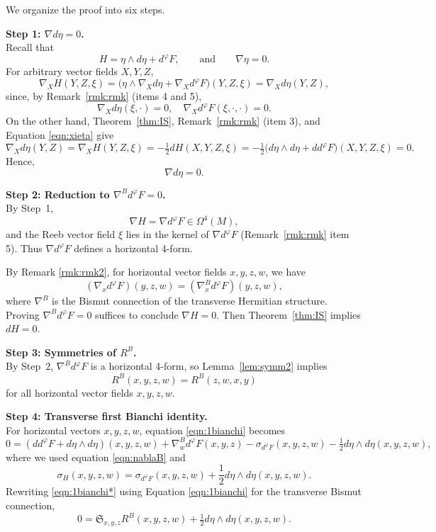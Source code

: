 \documentclass{article}
\makeatletter
\renewenvironment{proof}[1][\proofname]{%
  \par\pushQED{\qed}%
  \normalfont\topsep6\p@\@plus6\p@\relax
  \trivlist
  \item[\hskip\labelsep
        \textbf{\textup{#1}}\@addpunct{.}]\ignorespaces
}{%
  \popQED\endtrivlist\@endpefalse
}
\theoremstyle{definition}
\renewcommand{\phi}{\varphi}
\numberwithin{equation}{section}
\makeatother
\begin{document}
\begin{proof}[Proof of Theorem~\ref{thm:CKL}]
We organize the proof into six steps.

\medskip
\noindent
\textbf{Step 1: \(\nabla d\eta = 0\).}  
\\
Recall that
\[
H = \eta \wedge d\eta + d^\phi F, \qquad \text{and} \qquad \nabla \eta = 0.
\]
For arbitrary vector fields \(X,Y,Z\),
\[
\nabla_X H(Y,Z,\xi) = \big(\eta \wedge \nabla_X d\eta + \nabla_X d^\phi F\big)(Y,Z,\xi) = \nabla_X d\eta(Y,Z),
\]
since, by Remark~\ref{rmk:rmk} (items 4 and 5),
\[
\nabla_X d\eta(\xi,\cdot) = 0, \quad 
\nabla_X d^\phi F(\xi,\cdot,\cdot) = 0.
\]
On the other hand, Theorem~\ref{thm:IS}, Remark~\ref{rmk:rmk} (item 3), and Equation \eqref{eqn:xieta} give
\[
\nabla_X d\eta(Y,Z) = \nabla_X H(Y,Z,\xi) = -\tfrac{1}{2} dH(X,Y,Z,\xi) = -\tfrac{1}{2} \big( d\eta \wedge d\eta + d d^\phi F \big)(X,Y,Z,\xi) = 0.
\]
Hence,
\[
\nabla d\eta = 0.
\]

\medskip
\noindent
\textbf{Step 2: Reduction to \(\nabla^B d^\phi F = 0\).} \\ 
By Step~1,
\[
\nabla H = \nabla d^\phi F \in \Omega^4(M),
\]
and the Reeb vector field \(\xi\) lies in the kernel of \(\nabla d^\phi F\) (Remark~\ref{rmk:rmk} item 5).  
Thus \(\nabla d^\phi F\) defines a horizontal 4-form. \par
By Remark \ref{rmk:rmk2}, for horizontal vector fields \(x,y,z,w\), we have
\begin{equation}\label{eqn:nablaB}
(\nabla_x d^\phi F)(y,z,w) = (\nabla^B_x d^\phi F)(y,z,w),
\end{equation}
where \(\nabla^B\) is the Bismut connection of the transverse Hermitian structure.  
Proving \(\nabla^B d^\phi F = 0\) suffices to conclude \(\nabla H = 0\). Then Theorem~\ref{thm:IS} implies \(dH = 0\).

\medskip
\noindent
\textbf{Step 3: Symmetries of \(R^B\).} \\
By Step~2, \(\nabla^B d^\phi F\) is a horizontal 4-form, so Lemma~\ref{lem:symm2} implies
\[
R^B(x,y,z,w) = R^B(z,w,x,y)
\]
for all horizontal vector fields \(x,y,z,w\).

\medskip
\noindent
\textbf{Step 4: Transverse first Bianchi identity.}  \\
For horizontal vectors \(x,y,z,w\), equation \eqref{eqn:1bianchi} becomes
\begin{equation}\label{eqn:1bianchi*}
0 = (dd^\phi F + d\eta \wedge d\eta)(x,y,z,w) + \nabla^B_w d^\phi F(x,y,z) - \sigma_{d^\phi F}(x,y,z,w) - \tfrac{1}{2} d\eta \wedge d\eta(x,y,z,w),
\end{equation}
where we used equation \eqref{eqn:nablaB} and
\[
\sigma_H(x,y,z,w) = \sigma_{d^\phi F}(x,y,z,w) + \frac{1}{2} d\eta \wedge d\eta(x,y,z,w).
\]
Rewriting \eqref{eqn:1bianchi*} using Equation \eqref{eqn:1bianchi} for the transverse Bismut connection,
\[
0 = \mathfrak{S}_{x,y,z} R^B(x,y,z,w) + \tfrac{1}{2} d\eta \wedge d\eta(x,y,z,w).
\]


\end{proof}
\end{document}
